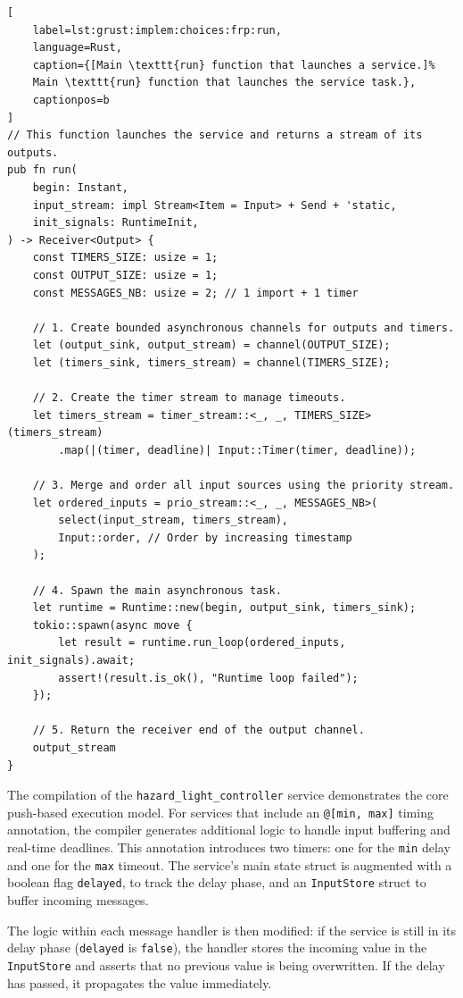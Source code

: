 \begin{lstlisting}[
    label=lst:grust:implem:choices:frp:run,
    language=Rust,
    caption={[Main \texttt{run} function that launches a service.]%
    Main \texttt{run} function that launches the service task.},
    captionpos=b
]
// This function launches the service and returns a stream of its outputs.
pub fn run(
    begin: Instant,
    input_stream: impl Stream<Item = Input> + Send + 'static,
    init_signals: RuntimeInit,
) -> Receiver<Output> {
    const TIMERS_SIZE: usize = 1;
    const OUTPUT_SIZE: usize = 1;
    const MESSAGES_NB: usize = 2; // 1 import + 1 timer

    // 1. Create bounded asynchronous channels for outputs and timers.
    let (output_sink, output_stream) = channel(OUTPUT_SIZE);
    let (timers_sink, timers_stream) = channel(TIMERS_SIZE);

    // 2. Create the timer stream to manage timeouts.
    let timers_stream = timer_stream::<_, _, TIMERS_SIZE>(timers_stream)
        .map(|(timer, deadline)| Input::Timer(timer, deadline));

    // 3. Merge and order all input sources using the priority stream.
    let ordered_inputs = prio_stream::<_, _, MESSAGES_NB>(
        select(input_stream, timers_stream),
        Input::order, // Order by increasing timestamp
    );

    // 4. Spawn the main asynchronous task.
    let runtime = Runtime::new(begin, output_sink, timers_sink);
    tokio::spawn(async move {
        let result = runtime.run_loop(ordered_inputs, init_signals).await;
        assert!(result.is_ok(), "Runtime loop failed");
    });

    // 5. Return the receiver end of the output channel.
    output_stream
}
\end{lstlisting}

The compilation of the \texttt{hazard\_light\_controller} service demonstrates the core push-based
execution model. For services that include an \texttt{@[min, max]} timing annotation, the compiler
generates additional logic to handle input buffering and real-time deadlines. This annotation
introduces two timers: one for the \texttt{min} delay and one for the \texttt{max} timeout. The
service's main state struct is augmented with a boolean flag \texttt{delayed}, to track the delay
phase, and an \texttt{InputStore} struct to buffer incoming messages.

The logic within each message handler is then modified: if the service is still in its delay phase
(\ie \texttt{delayed} is \texttt{false}), the handler stores the incoming value in the
\texttt{InputStore} and asserts that no previous value is being overwritten. If the delay has
passed, it propagates the value immediately.

